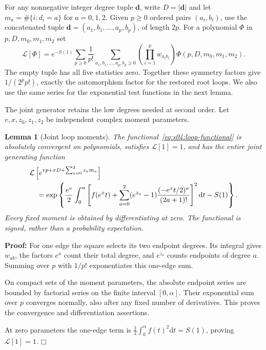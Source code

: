 \documentclass[a4paper,10pt]{article}
\numberwithin{equation}{section}
\newcommand{\dd}{\mathrm{d}}
\theoremstyle{paperplain}
\newtheorem{lmm}[thm]{Lemma}
\theoremstyle{paperremark}
\theoremstyle{paperplain}
\newenvironment{prf}{\noindent \textbf{Proof: }}{\hfill $\mdlgwhtsquare$\par\addvspace{0.5\baselineskip}}
\begin{document}
For any nonnegative integer degree tuple $\mathbf d$, write
$D=|\mathbf d|$ and let
$m_a=\#\{i:d_i=a\}$ for $a=0,1,2$. Given $p\geq0$ ordered pairs
$(a_i,b_i)$, use the concatenated tuple
$\mathbf d=(a_1,b_1,\ldots,a_p,b_p)$, of length $2p$.
For a polynomial $\Phi$ in $p,D,m_0,m_1,m_2$ set
\begin{equation}\label{eq:s04:loop-functional}
 \mathcal L[\Phi]=e^{-S(1)}\sum_{p\geq0}\frac1{p!}
 \sum_{a_1,b_1,\ldots,a_p,b_p\geq0}
   \left(\prod_{i=1}^p w_{a_i b_i}\right)
       \Phi(p,D,m_0,m_1,m_2).
\end{equation}
The empty tuple has all five statistics zero. Together these symmetry
factors give $1/(2^pp!)$, exactly the automorphism factor for the
restored root loops. We also use the same series for the exponential
test functions in the next lemma.

The joint generator retains the low degrees needed at second order.
Let $v,x,z_0,z_1,z_2$ be independent complex moment parameters.

\begin{lmm}[Joint loop moments]\label{lmm:s04:loop-moments}
The functional~\eqref{eq:s04:loop-functional} is absolutely convergent
on polynomials, satisfies $\mathcal L[1]=1$, and has the entire
joint generating function
\begin{align}
 &\mathcal L\left[e^{vp+xD+\sum_{a=0}^2z_a m_a}\right]\notag\\
 &\quad=\exp\left\{\frac{e^v}{2}\int_0^\alpha
 \left[f(e^x t)+\sum_{a=0}^2(e^{z_a}-1)
               \frac{(-e^x t/2)^a}{(2a+1)!}\right]^2\dd t-S(1)\right\}.
 \label{eq:s04:joint-generator}
\end{align}
Every fixed moment is obtained by differentiating at zero. The
functional is signed, rather than a probability expectation.
\end{lmm}
\begin{prf}
For one edge the square selects its two endpoint degrees. Its
integral gives $w_{ab}$, the factors $e^x$ count their total degree,
and $e^{z_a}$ counts endpoints of degree $a$. Summing over $p$ with
$1/p!$ exponentiates this one-edge sum.

On compact sets of the moment parameters, the absolute endpoint
series are bounded by factorial series on the finite interval
$[0,\alpha]$. Their exponential sum over $p$ converges normally,
also after any fixed number of derivatives. This proves the
convergence and differentiation assertions.

At zero parameters the
one-edge term is $\tfrac12\int_0^\alpha f(t)^2\dd t=S(1)$, proving
$\mathcal L[1]=1$.
\end{prf}
\end{document}

